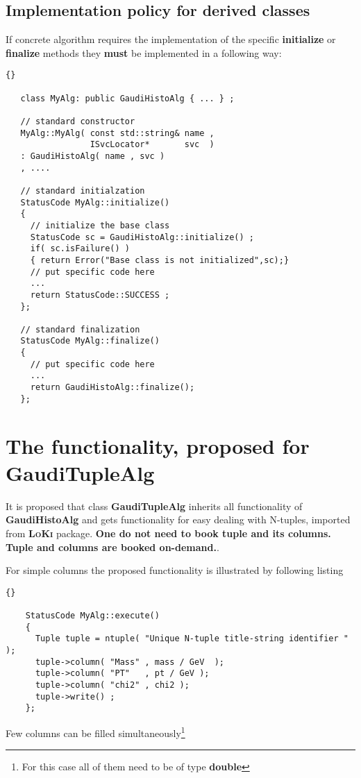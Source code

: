 \documentclass{lhcbnote}
\newcommand{\bftt}         {\ttfamily\bfseries}
\newcommand{\scbf}         {\scshape\bfseries}
\begin{document}
\section{Implementation policy for derived classes}
If concrete algorithm requires the implementation of 
the specific {\bftt{initialize}} or 
{\bftt{finalize}} methods they {\bftt{must}} be implemented 
in a following way:

\begin{scriptsize}
 \begin{lstlisting}{}

   class MyAlg: public GaudiHistoAlg { ... } ;

   // standard constructor 
   MyAlg::MyAlg( const std::string& name , 
                 ISvcLocator*       svc  ) 
   : GaudiHistoAlg( name , svc ) 
   , ....

   // standard initialzation
   StatusCode MyAlg::initialize() 
   {
     // initialize the base class 
     StatusCode sc = GaudiHistoAlg::initialize() ;
     if( sc.isFailure() ) 
     { return Error("Base class is not initialized",sc);}
     // put specific code here 
     ...
     return StatusCode::SUCCESS ;
   };
   
   // standard finalization
   StatusCode MyAlg::finalize() 
   {
     // put specific code here 
     ...
     return GaudiHistoAlg::finalize();
   };

 \end{lstlisting}
\end{scriptsize}


\chapter{The functionality, proposed for {\bftt{GaudiTupleAlg}}}
It is proposed that  class {\bftt{GaudiTupleAlg}} inherits 
all functionality of {\bftt{GaudiHistoAlg}} and gets functionality 
for easy dealing with N-tuples, 
imported from {\scbf{LoKi}} package. {\bf{One do not need to book tuple and its columns. 
Tuple and columns are booked on-demand.}}. 


For simple columns the proposed functionality is 
illustrated by following listing

\begin{scriptsize}
  \begin{lstlisting}{}

    StatusCode MyAlg::execute()
    {
      Tuple tuple = ntuple( "Unique N-tuple title-string identifier " );
      tuple->column( "Mass" , mass / GeV  );
      tuple->column( "PT"   , pt / GeV );
      tuple->column( "chi2" , chi2 );
      tuple->write() ;
    }; 

  \end{lstlisting}
\end{scriptsize}
Few columns can be filled simultaneously\footnote{For this case 
all of them need to be of type {\bftt{double}}}
\end{document}
